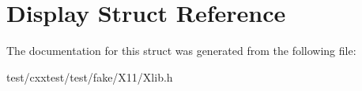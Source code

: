 \hypertarget{structDisplay}{\section{Display Struct Reference}
\label{structDisplay}
}


The documentation for this struct was generated from the following file\-:\begin{DoxyCompactItemize}
\item 
test/cxxtest/test/fake/\-X11/Xlib.\-h\end{DoxyCompactItemize}
